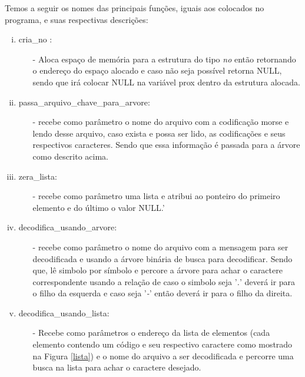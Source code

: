 \documentclass[12 pt, a4paper]{article}
\begin{document}
Temos a seguir os nomes das principais funções, iguais aos colocados no programa, e suas respectivas descrições:
\begin{enumerate}[(i)]
    \item cria\_no :
        \begin{itemize}
            \item[-] Aloca espaço de memória para a estrutura do tipo \textit{no} então retornando o endereço do espaço alocado e caso não seja possível retorna NULL, sendo que irá colocar NULL na variável prox dentro da estrutura alocada.
        \end{itemize}
    \item passa\_arquivo\_chave\_para\_arvore:
        \begin{itemize}
            \item[-] recebe como par\^ametro o nome do arquivo com a codifica\c{c}\~ao morse e lendo desse arquivo, caso exista e possa ser lido, as codifica\c{c}\~oes e seus respectivos caracteres. Sendo que essa informa\c{c}\~ao \'e passada para a \'arvore como descrito acima.
        \end{itemize}
    \item zera\_lista:
        \begin{itemize}
        \item[-] recebe como par\^ametro uma lista e atribui ao ponteiro do primeiro elemento e do \'ultimo o valor NULL.'
        \end{itemize}
    \item decodifica\_usando\_arvore:
        \begin{itemize}
            \item[-] recebe como par\^ametro o nome do arquivo com a mensagem para ser decodificada e usando a \'arvore bin\'aria de busca para decodificar. Sendo que, l\^e simbolo por s\'imbolo e percore a \'arvore para achar o caractere correspondente usando a rela\c{c}\~ao de caso o simbolo seja '\textit{.}' dever\'a ir para o filho da esquerda e caso seja '\textit{-}' ent\~ao dever\'a ir para o filho da direita.
        \end{itemize}
    \item decodifica\_usando\_lista:
        \begin{itemize}
            \item[-] Recebe como parâmetros o endereço da lista de elementos (cada elemento contendo um código e seu respectivo caractere como mostrado na Figura \ref{lista}) e o nome do arquivo a ser decodificada e percorre uma busca na lista para achar o caractere desejado.
        \end{itemize}
\end{enumerate}
\end{document}
